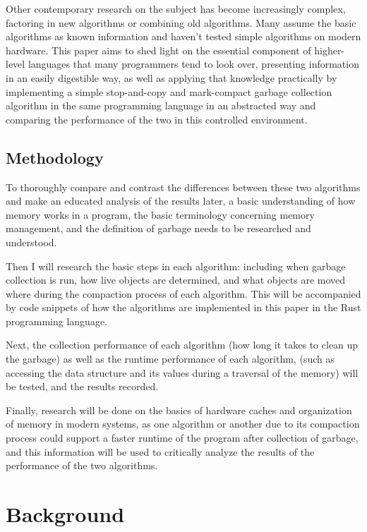 \documentclass[index]{subfiles}
\begin{document}
Other contemporary research on the subject has become increasingly complex, factoring in new algorithms or combining old algorithms. Many assume the basic algorithms as known information and haven't tested simple algorithms on modern hardware. This paper aims to shed light on the essential component of higher-level languages that many programmers tend to look over, presenting information in an easily digestible way, as well as applying that knowledge practically by implementing a simple stop-and-copy and mark-compact garbage collection algorithm in the same programming language in an abstracted way and comparing the performance of the two in this controlled environment.

\subsection{Methodology}

To thoroughly compare and contrast the differences between these two algorithms and make an educated analysis of the results later, a basic understanding of how memory works in a program, the basic terminology concerning memory management, and the definition of garbage needs to be researched and understood.

Then I will research the basic steps in each algorithm: including when garbage collection is run, how live objects are determined, and what objects are moved where during the compaction process of each algorithm. This will be accompanied by code snippets of how the algorithms are implemented in this paper in the Rust programming language.

Next, the collection performance of each algorithm (how long it takes to clean up the garbage) as well as the runtime performance of each algorithm, (such as accessing the data structure and its values during a traversal of the memory) will be tested, and the results recorded.

Finally, research will be done on the basics of hardware caches and organization of memory in modern systems, as one algorithm or another due to its compaction process could support a faster runtime of the program after collection of garbage, and this information will be used to critically analyze the results of the performance of the two algorithms.

\section{Background}
\end{document}
